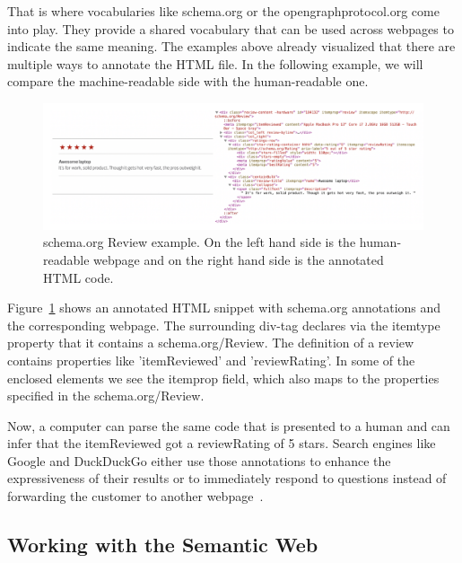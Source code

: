 That is where vocabularies like schema.org or the opengraphprotocol.org come into play.
They provide a shared vocabulary that can be used across webpages to indicate the same meaning.
The examples above already visualized that there are multiple ways to annotate the HTML file.
In the following example, we will compare the machine-readable side with the human-readable one.
\begin{figure}[!htbp]
    \centering
    \includegraphics[width=13cm]{images/schema_org_review.png}
    \caption[schema.org/Review Example]{schema.org Review example\protect\footnotemark.
        On the left hand side is the human-readable webpage and on the right hand side is the annotated HTML code.
    }
    \label{fig:schema_org_review}
\end{figure}
Figure~\ref{fig:schema_org_review} shows an annotated HTML snippet with schema.org annotations
and the corresponding webpage.
The surrounding div-tag declares via the itemtype property that it contains a schema.org/Review.
The definition of a review contains properties like 'itemReviewed' and 'reviewRating'.
In some of the enclosed elements we see the itemprop field, which also maps to the properties specified in the
schema.org/Review.

Now, a computer can parse the same code that is presented to a human and can infer that the itemReviewed
got a reviewRating of 5 stars.
Search engines like Google and DuckDuckGo either use those annotations to enhance the expressiveness of their
results or to immediately respond to questions instead of forwarding the customer to another webpage~\cite{vandic2012faceted}.

\subsection{Working with the Semantic Web}
\label{subsec:semantic-web-working}

